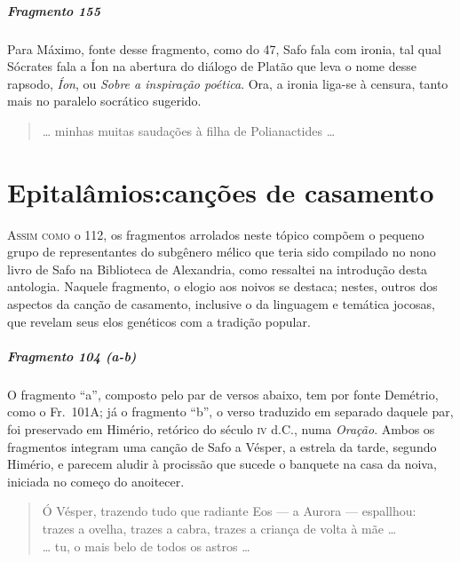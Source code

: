 {\paragraph{Fragmento 155}

{\small Para Máximo, fonte desse fragmento, como do 47, Safo fala com ironia, tal qual
Sócrates fala a Íon na abertura do diálogo de Platão que leva o nome desse
rapsodo, \textit{Íon}, ou \textit{Sobre a inspiração poética}. Ora, a ironia
liga-se à censura, tanto mais no paralelo socrático sugerido.}

\begin{verse}
\ldots{} minhas muitas saudações à filha de Polianactides \ldots{}
\end{verse}


\chapter[Epitalâmios: canções de casamento]{Epitalâmios:\break canções de casamento}

\textsc{Assim como} o 112, os fragmentos arrolados neste tópico compõem o pequeno grupo
de representantes do subgênero mélico que teria sido compilado no nono livro de
Safo na Biblioteca de Alexandria, como ressaltei na introdução desta antologia.
Naquele fragmento, o elogio aos noivos se destaca; nestes, outros dos aspectos
da canção de casamento, inclusive o da linguagem e temática jocosas, que
revelam seus elos genéticos com a tradição popular.

\paragraph{Fragmento 104 (a-b)}

{\small O fragmento “a”, composto pelo par de versos abaixo, tem por fonte Demétrio,
como o Fr.~101A; já o fragmento “b”, o verso traduzido em separado daquele par,
foi preservado em Himério, retórico do século \textsc{iv} d.C., numa \textit{Oração}.
Ambos os fragmentos integram uma canção de Safo a Vésper, a estrela da tarde,
segundo Himério, e parecem aludir à procissão que sucede o banquete na casa da
noiva, iniciada no começo do anoitecer.}

\begin{verse}
Ó Vésper, trazendo tudo que radiante Eos --- a Aurora --- espallhou:\\
trazes a ovelha, trazes a cabra, trazes a criança de volta à mãe \ldots{}\\
\ldots{} tu, o mais belo de todos os astros \ldots{} 
\end{verse}


}
